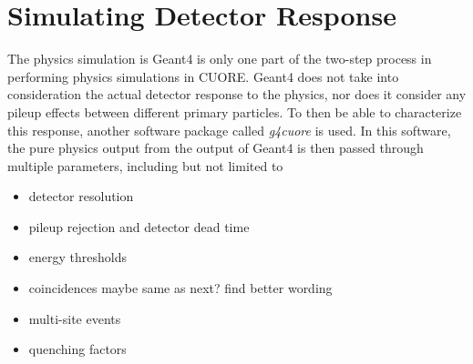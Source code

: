 \section{Simulating Detector Response}
The physics simulation is Geant4 is only one part of the two-step process in performing physics simulations in CUORE.
Geant4 does not take into consideration the actual detector response to the physics, nor does it consider any pileup effects between different primary particles.
To then be able to characterize this response, another software package called \textit{g4cuore} is used.
In this software, the pure physics output from the output of Geant4 is then passed through multiple parameters, including but not limited to
\begin{itemize}
    \item detector resolution
    \item pileup rejection and detector dead time
    \item energy thresholds
    \item coincidences \color{red} maybe same as next? find better wording \color{black}
    \item multi-site events
    \item quenching factors
\end{itemize}